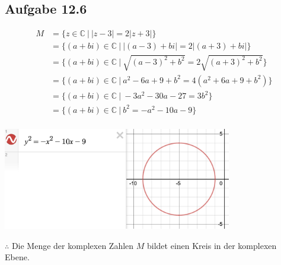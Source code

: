 \documentclass{standalone}
\begin{document}
\subsection{Aufgabe 12.6}
    \begin{align*}
        M &= \{z\in\mathbb{C}\ |\ |z-3| = 2|z+3|\} \\
          &= \{(a+bi)\in\mathbb{C}\ |\ |(a-3)+bi| = 2|(a+3)+bi|\} \\
          &= \{(a+bi)\in\mathbb{C}\ |\ \sqrt{(a-3)^2+b^2} = 2\sqrt{(a+3)^2+b^2}\} \\
          &= \{(a+bi)\in\mathbb{C}\ |\ a^2-6a+9+b^2 = 4(a^2+6a+9+b^2)\} \\
          &= \{(a+bi)\in\mathbb{C}\ |\ -3a^2-30a-27 = 3b^2\} \\
          &= \{(a+bi)\in\mathbb{C}\ |\ b^2 = -a^2-10a-9\} \\
    \end{align*}

    \begin{center}
        \includegraphics[width=10cm]{img/12_6.png}
    \end{center}

    $\therefore$ Die Menge der komplexen Zahlen $M$ bildet einen Kreis in der komplexen Ebene.
\end{document}
